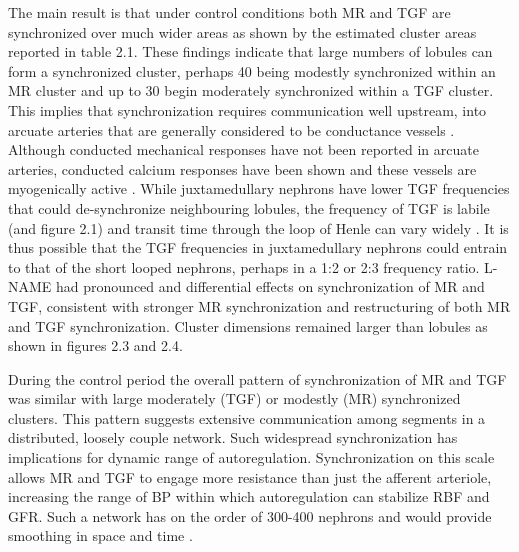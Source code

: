 	The main result is that under control conditions both MR and TGF are synchronized over much wider areas as shown by the estimated cluster areas reported in table 2.1. These findings indicate that large numbers of lobules can form a synchronized cluster, perhaps 40 being modestly synchronized within an MR cluster and up to 30 begin moderately synchronized within a TGF cluster. This implies that synchronization requires communication well upstream, into arcuate arteries that are generally considered to be conductance vessels \cite{Zamir87}. Although conducted mechanical responses have not been reported in arcuate arteries, conducted calcium responses have been shown \cite{Goligorsky95} and these vessels are myogenically active \cite{Kauser91}. While juxtamedullary nephrons have lower TGF frequencies \cite{HolsteinRathlou89} that could de-synchronize neighbouring lobules, the frequency of TGF is labile \cite{Zou02,Chon08} (and figure 2.1) and transit time through the loop of Henle can vary widely \cite{Steinhausen76,Stumpe70}. It is thus possible that the TGF frequencies in juxtamedullary nephrons could entrain to that of the short looped nephrons, perhaps in a 1:2 or 2:3 frequency ratio. L-NAME had pronounced and differential effects on synchronization of MR and TGF, consistent with stronger MR synchronization and restructuring of both MR and TGF synchronization. Cluster dimensions remained larger than lobules as shown in figures 2.3 and 2.4.
	
	During the control period the overall pattern of synchronization of MR and TGF was similar with large moderately (TGF) or modestly (MR) synchronized clusters. This pattern suggests extensive communication among segments in a distributed, loosely couple network. Such widespread synchronization has implications for dynamic range of autoregulation. Synchronization on this scale allows MR and TGF to engage more resistance than just the afferent arteriole, increasing the range of BP within which autoregulation can stabilize RBF and GFR. Such a network has on the order of 300-400 nephrons and would provide smoothing in space and time \cite{Tran12}.
	
